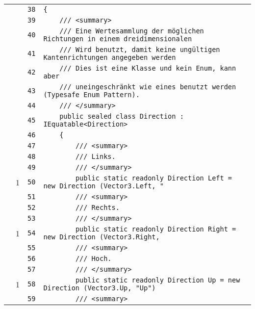 \documentclass[a4paper,10pt]{article}
\begin{document}
\begin{longtable}[l]{lrrl}
\cellcolor{gray} &  & \verb~38~ & \verb~{~\\
\cellcolor{gray} &  & \verb~39~ & \verb~    /// <summary>~\\
\cellcolor{gray} &  & \verb~40~ & \verb~    /// Eine Wertesammlung der möglichen Richtungen in einem dreidimensionalen~\\
\cellcolor{gray} &  & \verb~41~ & \verb~    /// Wird benutzt, damit keine ungültigen Kantenrichtungen angegeben werden~\\
\cellcolor{gray} &  & \verb~42~ & \verb~    /// Dies ist eine Klasse und kein Enum, kann aber~\\
\cellcolor{gray} &  & \verb~43~ & \verb~    /// uneingeschränkt wie eines benutzt werden (Typesafe Enum Pattern).~\\
\cellcolor{gray} &  & \verb~44~ & \verb~    /// </summary>~\\
\cellcolor{gray} &  & \verb~45~ & \verb~    public sealed class Direction : IEquatable<Direction>~\\
\cellcolor{gray} &  & \verb~46~ & \verb~    {~\\
\cellcolor{gray} &  & \verb~47~ & \verb~        /// <summary>~\\
\cellcolor{gray} &  & \verb~48~ & \verb~        /// Links.~\\
\cellcolor{gray} &  & \verb~49~ & \verb~        /// </summary>~\\
\cellcolor{green} & 1 & \verb~50~ & \verb~        public static readonly Direction Left = new Direction (Vector3.Left, "~\\
\cellcolor{gray} &  & \verb~51~ & \verb~        /// <summary>~\\
\cellcolor{gray} &  & \verb~52~ & \verb~        /// Rechts.~\\
\cellcolor{gray} &  & \verb~53~ & \verb~        /// </summary>~\\
\cellcolor{green} & 1 & \verb~54~ & \verb~        public static readonly Direction Right = new Direction (Vector3.Right,~\\
\cellcolor{gray} &  & \verb~55~ & \verb~        /// <summary>~\\
\cellcolor{gray} &  & \verb~56~ & \verb~        /// Hoch.~\\
\cellcolor{gray} &  & \verb~57~ & \verb~        /// </summary>~\\
\cellcolor{green} & 1 & \verb~58~ & \verb~        public static readonly Direction Up = new Direction (Vector3.Up, "Up")~\\
\cellcolor{gray} &  & \verb~59~ & \verb~        /// <summary>~\\

\end{longtable}
\end{document}
